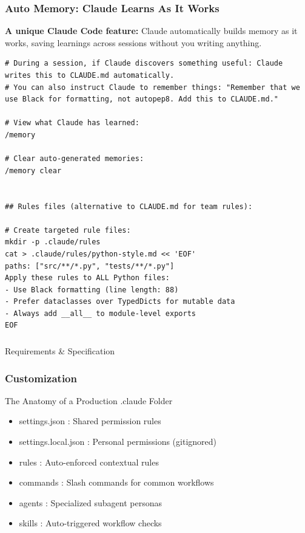 \begin{frame}[fragile]\frametitle{Auto Memory: Claude Learns As It Works}
\textbf{A unique Claude Code feature:} Claude automatically builds memory as it works, saving learnings across sessions without you writing anything.

\begin{lstlisting}
# During a session, if Claude discovers something useful: Claude writes this to CLAUDE.md automatically.
# You can also instruct Claude to remember things: "Remember that we use Black for formatting, not autopep8. Add this to CLAUDE.md."

# View what Claude has learned:
/memory

# Clear auto-generated memories:
/memory clear


## Rules files (alternative to CLAUDE.md for team rules):

# Create targeted rule files:
mkdir -p .claude/rules
cat > .claude/rules/python-style.md << 'EOF'
paths: ["src/**/*.py", "tests/**/*.py"]
Apply these rules to ALL Python files:
- Use Black formatting (line length: 88)
- Prefer dataclasses over TypedDicts for mutable data
- Always add __all__ to module-level exports
EOF
\end{lstlisting}
\end{frame}


\begin{frame}[fragile]\frametitle{}
\begin{center}
{\Large Requirements \& Specification}

\end{center}
\end{frame}

\begin{frame}[fragile]\frametitle{Customization}
The Anatomy of a Production .claude Folder
	  \begin{itemize}
			\item settings.json : Shared permission rules
			\item settings.local.json : Personal permissions (gitignored)
			\item rules  : Auto-enforced contextual rules
			\item commands  : Slash commands for common workflows
			\item agents  : Specialized subagent personas
			\item skills  :  Auto-triggered workflow checks
      \end{itemize}
\end{frame}
	  
